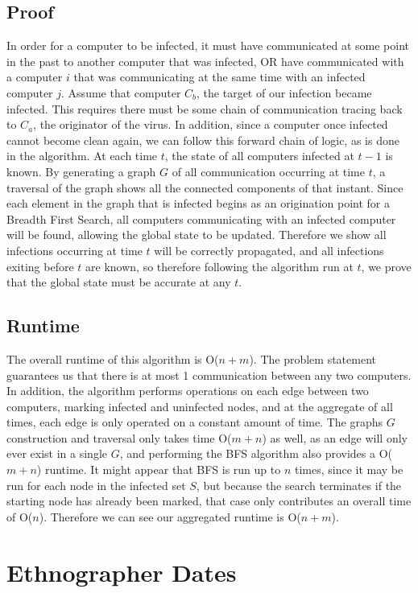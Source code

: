 \documentclass[titlepage]{article}
\numberwithin{equation}{subsection}
\begin{document}
\subsection{Proof}
In order for a computer to be infected, it must have communicated at some
point in the past to another computer that was infected, OR have communicated
with a computer $i$ that was communicating at the same time with an infected 
computer $j$. Assume that computer $C_b$, the target of our infection became
infected. This requires there must be some chain of communication tracing back
to $C_a$, the originator of the virus. In addition, since a computer once infected
cannot become clean again, we can follow this forward chain of logic, as is
done in the algorithm. At each time $t$, the state of all computers infected
at $t-1$ is known. By generating a graph $G$ of all communication occurring at
time $t$, a traversal of the graph shows all the connected components of 
that instant. Since each element in the graph that is infected begins as an origination
point for a Breadth First Search, all computers communicating with an infected
computer will be found, allowing the global state to be updated. Therefore we show
all infections occurring at time $t$ will be correctly propagated, and all infections
exiting before $t$ are known, so therefore following the algorithm run at $t$, we prove
that the global state must be accurate at any $t$.
\subsection{Runtime}
The overall runtime of this algorithm is O($n+m$). The problem statement
guarantees us that there is at most 1 communication between any two computers.
In addition, the algorithm performs operations on each edge between two computers,
marking infected and uninfected nodes, and at the aggregate of all times, each
edge is only operated on a constant amount of time. The graphs $G$ construction and
traversal only takes time O($m+n$) as well, as an edge will only ever
exist in a single $G$, and performing the BFS algorithm also provides a O($m+n$) runtime.
It might appear that BFS is run up to $n$ times, since it may be run for each
node in the infected set $S$, but because the search terminates if the starting node has
already been marked, that case only contributes an overall time of O($n$). Therefore
we can see our aggregated runtime is O($n+m$).
\section{Ethnographer Dates}
\end{document}

